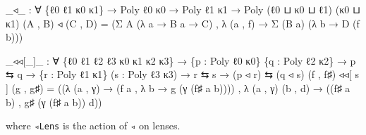 \documentclass[
  11pt,
  oneside,
  article]{memoir}
\newenvironment{Shaded}{}{}
\newcommand{\NormalTok}[1]{#1}
\newcommand{\OtherTok}[1]{\textcolor[rgb]{0.00,0.44,0.13}{#1}}
\theoremstyle{definition}
\theoremstyle{plain}
\newcommand{\0}{\textsf{0}}
\newcommand{\1}{\tn{\textsf{1}}}
\begin{document}
\begin{Shaded}
\begin{Highlighting}[]
\OtherTok{\_}\NormalTok{◃}\OtherTok{\_} \OtherTok{:} \OtherTok{∀} \OtherTok{\{}\NormalTok{ℓ0 ℓ1 κ0 κ1}\OtherTok{\}} \OtherTok{→}\NormalTok{ Poly ℓ0 κ0 }\OtherTok{→}\NormalTok{ Poly ℓ1 κ1 }\OtherTok{→}\NormalTok{ Poly }\OtherTok{(}\NormalTok{ℓ0 ⊔ κ0 ⊔ ℓ1}\OtherTok{)} \OtherTok{(}\NormalTok{κ0 ⊔ κ1}\OtherTok{)}
\OtherTok{(}\NormalTok{A , B}\OtherTok{)}\NormalTok{ ◃ }\OtherTok{(}\NormalTok{C , D}\OtherTok{)} \OtherTok{=} \OtherTok{(}\NormalTok{Σ A }\OtherTok{(λ}\NormalTok{ a }\OtherTok{→}\NormalTok{ B a }\OtherTok{→}\NormalTok{ C}\OtherTok{)}\NormalTok{ , }\OtherTok{λ} \OtherTok{(}\NormalTok{a , f}\OtherTok{)} \OtherTok{→}\NormalTok{ Σ }\OtherTok{(}\NormalTok{B a}\OtherTok{)} \OtherTok{(λ}\NormalTok{ b }\OtherTok{→}\NormalTok{ D }\OtherTok{(}\NormalTok{f b}\OtherTok{)))}

\OtherTok{\_}\NormalTok{◃◃[}\OtherTok{\_}\NormalTok{]}\OtherTok{\_} \OtherTok{:} \OtherTok{∀} \OtherTok{\{}\NormalTok{ℓ0 ℓ1 ℓ2 ℓ3 κ0 κ1 κ2 κ3}\OtherTok{\}}
        \OtherTok{→} \OtherTok{\{}\NormalTok{p }\OtherTok{:}\NormalTok{ Poly ℓ0 κ0}\OtherTok{\}} \OtherTok{\{}\NormalTok{q }\OtherTok{:}\NormalTok{ Poly ℓ2 κ2}\OtherTok{\}} \OtherTok{→}\NormalTok{ p ⇆ q}
        \OtherTok{→} \OtherTok{\{}\NormalTok{r }\OtherTok{:}\NormalTok{ Poly ℓ1 κ1}\OtherTok{\}} \OtherTok{(}\NormalTok{s }\OtherTok{:}\NormalTok{ Poly ℓ3 κ3}\OtherTok{)} \OtherTok{→}\NormalTok{ r ⇆ s }
        \OtherTok{→} \OtherTok{(}\NormalTok{p ◃ r}\OtherTok{)}\NormalTok{ ⇆ }\OtherTok{(}\NormalTok{q ◃ s}\OtherTok{)}
\OtherTok{(}\NormalTok{f , f♯}\OtherTok{)}\NormalTok{ ◃◃[ s ] }\OtherTok{(}\NormalTok{g , g♯}\OtherTok{)} \OtherTok{=}
    \OtherTok{((λ} \OtherTok{(}\NormalTok{a , γ}\OtherTok{)} \OtherTok{→} \OtherTok{(}\NormalTok{f a , }\OtherTok{λ}\NormalTok{ b\textquotesingle{} }\OtherTok{→}\NormalTok{ g }\OtherTok{(}\NormalTok{γ }\OtherTok{(}\NormalTok{f♯ a b\textquotesingle{}}\OtherTok{))))}
\NormalTok{    , }\OtherTok{λ} \OtherTok{(}\NormalTok{a , γ}\OtherTok{)} \OtherTok{(}\NormalTok{b\textquotesingle{} , d\textquotesingle{}}\OtherTok{)} \OtherTok{→} \OtherTok{((}\NormalTok{f♯ a b\textquotesingle{}}\OtherTok{)}\NormalTok{ , g♯ }\OtherTok{(}\NormalTok{γ }\OtherTok{(}\NormalTok{f♯ a b\textquotesingle{}}\OtherTok{))}\NormalTok{ d\textquotesingle{}}\OtherTok{))}
\end{Highlighting}
\end{Shaded}

where \texttt{◃Lens} is the action of \texttt{◃} on lenses.
\end{document}
